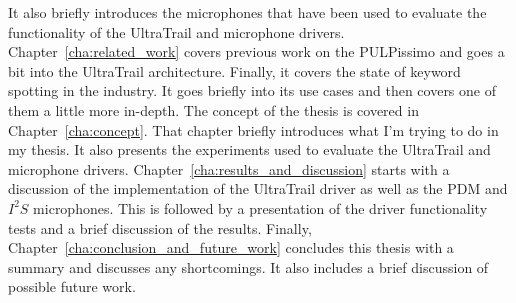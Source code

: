 It also briefly introduces the microphones that have been used to evaluate the functionality of the UltraTrail and microphone drivers.\\
Chapter~\ref{cha:related_work} covers previous work on the PULPissimo \cite{pulpissimo} and goes a bit into the UltraTrail architecture.
Finally, it covers the state of keyword spotting in the industry.
It goes briefly into its use cases and then covers one of them a little more in-depth.
The concept of the thesis is covered in Chapter~\ref{cha:concept}.
That chapter briefly introduces what I'm trying to do in my thesis.
It also presents the experiments used to evaluate the UltraTrail and microphone drivers.
Chapter~\ref{cha:results_and_discussion} starts with a discussion of the implementation
of the UltraTrail driver as well as the PDM and $I^2S$ microphones.
This is followed by a presentation of the driver functionality tests and a brief discussion of the results.
Finally, Chapter~\ref{cha:conclusion_and_future_work} concludes this thesis with a summary and discusses any shortcomings.
It also includes a brief discussion of possible future work.
